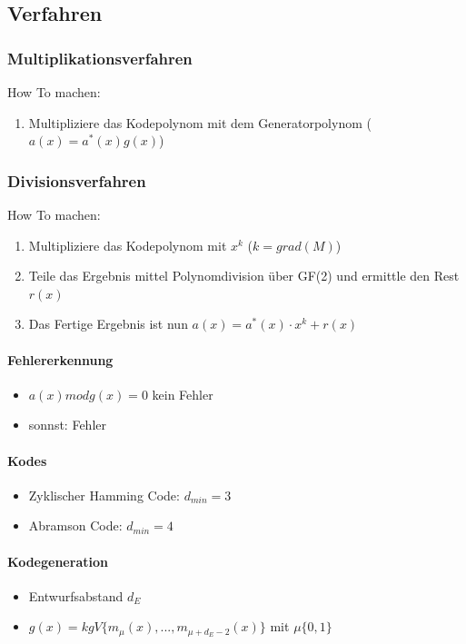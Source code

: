 \documentclass[12pt,a4paper]{article}
\begin{document}
\subsection{Verfahren}
\subsubsection{Multiplikationsverfahren}
How To machen:
\begin{enumerate}
\item Multipliziere das Kodepolynom mit dem Generatorpolynom ($a(x) = a^*(x) g(x)$)
\end{enumerate}
\subsubsection{Divisionsverfahren}
How To machen:
\begin{enumerate}
\item Multipliziere das Kodepolynom mit $x^k$ ($k = grad(M)$)
\item Teile das Ergebnis mittel Polynomdivision über GF(2) und ermittle den Rest $r(x)$
\item Das Fertige Ergebnis ist nun $a(x) = a^*(x) \cdot x^k + r(x)$
\end{enumerate}

\paragraph{Fehlererkennung\\}
\begin{itemize}
\item $a(x) mod g(x) = 0$ kein Fehler
\item sonnst: Fehler
\end{itemize}

\paragraph{Kodes\\}
\begin{itemize}
\item Zyklischer Hamming Code: $d_{min} = 3$
\item Abramson Code: $d_{min} = 4$
\end{itemize}

\paragraph{Kodegeneration\\}
\begin{itemize}
\item Entwurfsabstand $d_E$ 
\item $g(x) = kgV\{m_{\mu}(x), ..., m_{\mu + d_E - 2}(x)\}$ mit $\mu \{0, 1\}$
\end{itemize}
\end{document}
